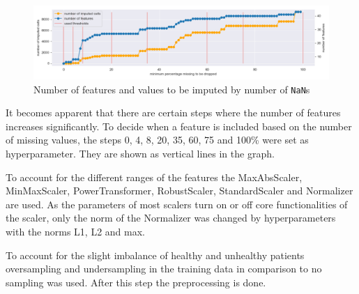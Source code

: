 \begin{figure}[h]
	\centering
	\includegraphics[width=\textwidth]{images/percentageToBeDropped.png}
	\caption{Number of features and values to be imputed by number of \texttt{NaN}s}
	\label{fig:percentageToBeDropped}
\end{figure}

It becomes apparent that there are certain steps where the number of features increases significantly. To decide when a feature is included based on the number of missing values, the steps 0, 4, 8, 20, 35, 60, 75 and 100\% were set as hyperparameter. They are shown as vertical lines in the graph. 

To account for the different ranges of the features the MaxAbsScaler, MinMaxScaler, PowerTransformer, RobustScaler, StandardScaler and Normalizer are used. As the parameters of most scalers turn on or off core functionalities of the scaler, only  the norm of the Normalizer was changed by hyperparameters with the norms L1, L2 and max.

To account for the slight imbalance of healthy and unhealthy patients oversampling and undersampling in the training data in comparison to no sampling was used. After this step the preprocessing is done. 


